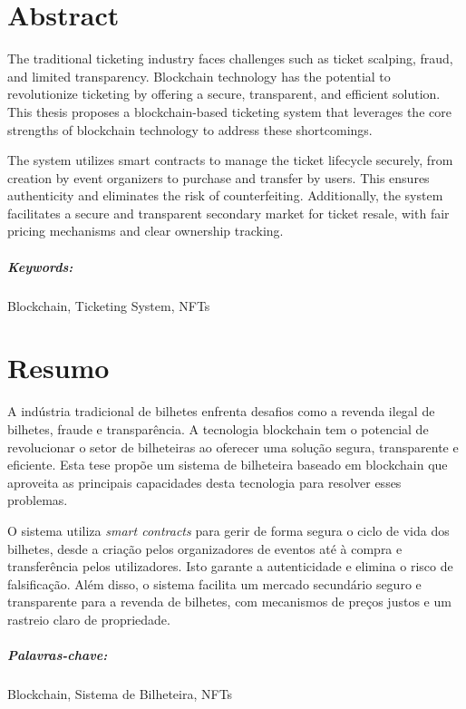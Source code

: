 \chapter*{Abstract}

The traditional ticketing industry faces challenges such as ticket scalping,
fraud, and limited transparency. Blockchain technology has the potential to
revolutionize ticketing by offering a secure, transparent, and efficient
solution. This thesis proposes a blockchain-based ticketing system that
leverages the core strengths of blockchain technology to address these
shortcomings.

The system utilizes smart contracts to manage the ticket lifecycle securely,
from creation by event organizers to purchase and transfer by users. This
ensures authenticity and eliminates the risk of counterfeiting. Additionally,
the system facilitates a secure and transparent secondary market for ticket
resale, with fair pricing mechanisms and clear ownership tracking.

\paragraph{Keywords:} Blockchain, Ticketing System, NFTs

\chapter*{Resumo}

A indústria tradicional de bilhetes enfrenta desafios como a revenda ilegal de
bilhetes, fraude e transparência. A tecnologia blockchain tem o potencial de
revolucionar o setor de bilheteiras ao oferecer uma solução segura,
transparente e eficiente. Esta tese propõe um sistema de bilheteira baseado em
blockchain que aproveita as principais capacidades desta tecnologia para
resolver esses problemas.

O sistema utiliza \textit{smart contracts} para gerir de forma segura o ciclo
de vida dos bilhetes, desde a criação pelos organizadores de eventos até à
compra e transferência pelos utilizadores. Isto garante a autenticidade e
elimina o risco de falsificação. Além disso, o sistema facilita um mercado
secundário seguro e transparente para a revenda de bilhetes, com mecanismos de
preços justos e um rastreio claro de propriedade.

\paragraph{Palavras-chave:} Blockchain, Sistema de Bilheteira, NFTs